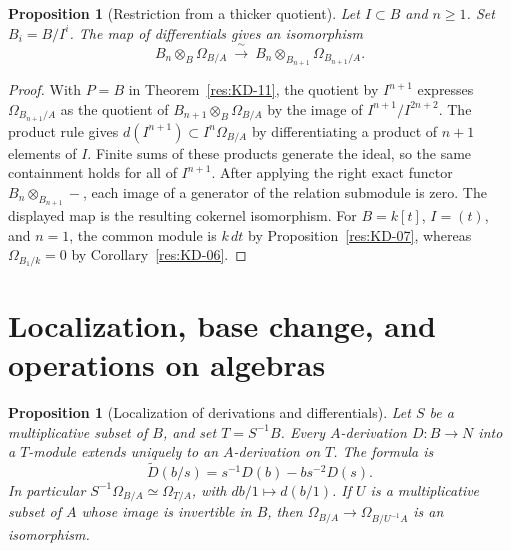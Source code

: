 \documentclass[11pt,oneside,openany]{book}
\newtheorem{proposition}[theorem]{Proposition}
\theoremstyle{definition}
\theoremstyle{remark}
\begin{document}
\begin{proposition}[Restriction from a thicker quotient]\label{res:KD-15}
Let $I\subset B$ and $n\ge 1$. Set $B_i=B/I^i$. The map of differentials gives an isomorphism
\[
 B_n\otimes_B\Omega_{B/A}\ \xrightarrow{\ \sim\ }\
 B_n\otimes_{B_{n+1}}\Omega_{B_{n+1}/A}.
\]
\end{proposition}

\begin{proof}
With $P=B$ in Theorem~\ref{res:KD-11}, the quotient by $I^{n+1}$ expresses $\Omega_{B_{n+1}/A}$ as the quotient of $B_{n+1}\otimes_B\Omega_{B/A}$ by the image of $I^{n+1}/I^{2n+2}$. The product rule gives $d(I^{n+1})\subset I^n\Omega_{B/A}$ by differentiating a product of $n+1$ elements of $I$. Finite sums of these products generate the ideal, so the same containment holds for all of $I^{n+1}$. After applying the right exact functor $B_n\otimes_{B_{n+1}}-$, each image of a generator of the relation submodule is zero. The displayed map is the resulting cokernel isomorphism. For $B=k[t]$, $I=(t)$, and $n=1$, the common module is $k\,dt$ by Proposition~\ref{res:KD-07}, whereas $\Omega_{B_1/k}=0$ by Corollary~\ref{res:KD-06}.
\end{proof}

\section{Localization, base change, and operations on algebras}

\begin{proposition}[Localization of derivations and differentials]\label{res:KD-16}
Let $S$ be a multiplicative subset of $B$, and set $T=S^{-1}B$. Every $A$-derivation $D:B\to N$ into a $T$-module extends uniquely to an $A$-derivation on $T$. The formula is
\[
 \widetilde D(b/s)=s^{-1}D(b)-bs^{-2}D(s).
\]
In particular $S^{-1}\Omega_{B/A}\simeq \Omega_{T/A}$, with $db/1\mapsto d(b/1)$. If $U$ is a multiplicative subset of $A$ whose image is invertible in $B$, then $\Omega_{B/A}\to\Omega_{B/U^{-1}A}$ is an isomorphism.
\end{proposition}
\end{document}
